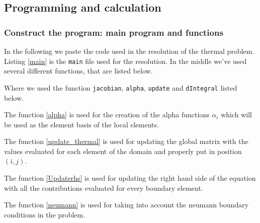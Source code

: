 \subsection{Programming and calculation}
\subsubsection{Construct the program: main program and functions}
In the following we paste the code used in the resolution of the thermal problem. 
Listing \ref{main} is the \texttt{main} file used for the resolution. In the middle we've used several different functions, that are listed below.



Where we used the function \texttt{jacobian}, \texttt{alpha}, \texttt{update} and \texttt{dIntegral} listed below.




The function \ref{alpha} is used for the creation of the alpha functions $ \alpha_i $ which will be used as the element basis of the local elements.


The function \ref{update_thermal} is used for updating the global matrix with the values evaluated for each element of the domain and properly put in position $ (i,j) $.




The function \ref{Updaterhs} is used for updating the right hand side of the equation with all the contributions evaluated for every boundary element.






The function \ref{neumann} is used for taking into account the neumann boundary conditions in the problem.


